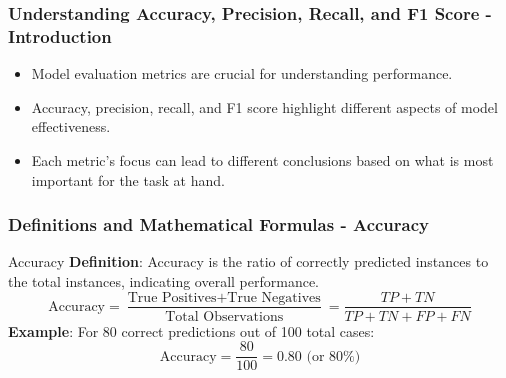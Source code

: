 \documentclass[aspectratio=169]{beamer}
\begin{document}
\begin{frame}[fragile]
    \frametitle{Understanding Accuracy, Precision, Recall, and F1 Score - Introduction}
    \begin{itemize}
        \item Model evaluation metrics are crucial for understanding performance.
        \item Accuracy, precision, recall, and F1 score highlight different aspects of model effectiveness.
        \item Each metric’s focus can lead to different conclusions based on what is most important for the task at hand.
    \end{itemize}
\end{frame}

\begin{frame}[fragile]
    \frametitle{Definitions and Mathematical Formulas - Accuracy}
    \begin{block}{Accuracy}
        \textbf{Definition}: Accuracy is the ratio of correctly predicted instances to the total instances, indicating overall performance.
        \begin{equation}
            \text{Accuracy} = \frac{\text{True Positives} + \text{True Negatives}}{\text{Total Observations}} = \frac{TP + TN}{TP + TN + FP + FN}
        \end{equation}
        \textbf{Example}: For 80 correct predictions out of 100 total cases:
        \begin{equation}
            \text{Accuracy} = \frac{80}{100} = 0.80 \text{ (or 80\%)}
        \end{equation}
    \end{block}
\end{frame}
\end{document}
